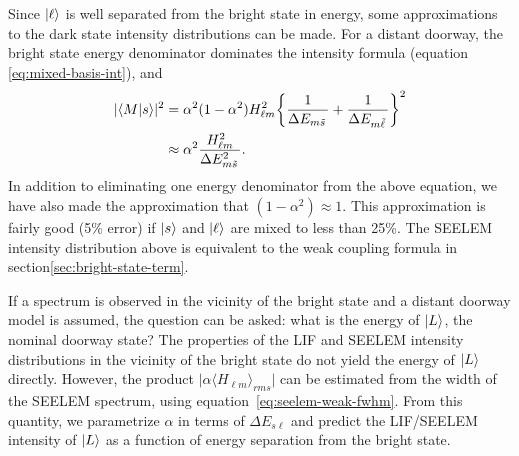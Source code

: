 \documentclass[12pt]{mitthesis}
\newcommand{\ts}{\tilde{s}\,}
\newcommand{\tl}{\tilde{\ell}\,}
\begin{document}
Since $\mathinner{|{\ell}\rangle}$ is well separated from the bright state in energy,
some approximations to the dark state intensity distributions can be
made.  For a distant doorway, the bright state energy denominator
dominates the intensity formula (equation \ref{eq:mixed-basis-int}),
and
\begin{equation}
  \label{eq:distant-lif}
  \begin{split}
  \lvert \braket{M|s} \rvert^2& = 
  \alpha^2 (1-\alpha^2) H_{\ell m}^2 
   \biggl \lbrace 
   \frac{1}{\Delta E_{m \ts}} +\frac{1}{\Delta E_{m \tl}}
   \biggr \rbrace^2\\
   & \approx \alpha^2 \frac{H_{\ell m}^2}{\Delta E_{m \ts}^2}.\\
   \end{split}
\end{equation}
In addition to eliminating one energy denominator from the above
equation, we have also made the approximation that $(1-\alpha^2)
\approx 1$.  This approximation is fairly good (5\% error) if
$\mathinner{|{s}\rangle}$ and $\mathinner{|{\ell}\rangle}$ are mixed to less than 25\%.  The SEELEM
intensity distribution above is equivalent to the weak coupling
formula in section\ref{sec:bright-state-term}.

If a spectrum is observed in the vicinity of the bright state and a
distant doorway model is assumed, the question can be asked: what is
the energy of $\mathinner{|{L}\rangle}$, the nominal doorway state?  The properties of
the LIF and SEELEM intensity distributions in the vicinity of the
bright state do not yield the energy of $\mathinner{|{L}\rangle}$ directly.  However,
the product $\lvert \alpha \langle H_{\ell m} \rangle_{rms} \rvert$
can be estimated from the width of the SEELEM spectrum, using
equation~\ref{eq:seelem-weak-fwhm}.  From this quantity, we
parametrize $\alpha$ in terms of $\Delta E_{s\ell}$ and predict the
LIF/SEELEM intensity of $\mathinner{|{L}\rangle}$ as a function of energy separation
from the bright state.
\end{document}
